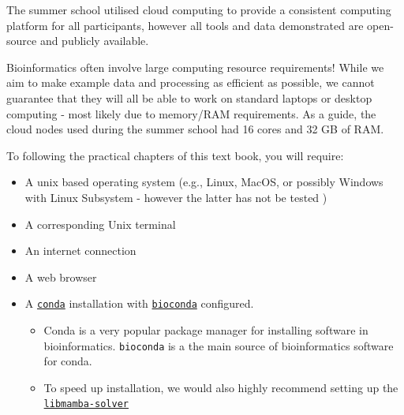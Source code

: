 \documentclass[
  letterpaper,
]{book}
\providecommand{\tightlist}{%
  \setlength{\itemsep}{0pt}\setlength{\parskip}{0pt}}\usepackage{longtable,booktabs,array}
\begin{document}
The summer school utilised cloud computing to provide a consistent
computing platform for all participants, however all tools and data
demonstrated are open-source and publicly available.

\begin{tcolorbox}[enhanced jigsaw, opacitybacktitle=0.6, bottomtitle=1mm, opacityback=0, colback=white, coltitle=black, leftrule=.75mm, toprule=.15mm, title=\textcolor{quarto-callout-warning-color}{\faExclamationTriangle}\hspace{0.5em}{Warning}, colframe=quarto-callout-warning-color-frame, toptitle=1mm, arc=.35mm, left=2mm, titlerule=0mm, breakable, rightrule=.15mm, bottomrule=.15mm, colbacktitle=quarto-callout-warning-color!10!white]

Bioinformatics often involve large computing resource requirements!
While we aim to make example data and processing as efficient as
possible, we cannot guarantee that they will all be able to work on
standard laptops or desktop computing - most likely due to memory/RAM
requirements. As a guide, the cloud nodes used during the summer school
had 16 cores and 32 GB of RAM.

\end{tcolorbox}

To following the practical chapters of this text book, you will require:

\begin{itemize}
\tightlist
\item
  A unix based operating system (e.g., Linux, MacOS, or possibly Windows
  with Linux Subsystem - however the latter has not be tested )
\item
  A corresponding Unix terminal
\item
  An internet connection
\item
  A web browser
\item
  A
  \href{https://docs.conda.io/en/latest/miniconda.html}{\texttt{conda}}
  installation with
  \href{https://bioconda.github.io/\#usage}{\texttt{bioconda}}
  configured.

  \begin{itemize}
  \tightlist
  \item
    Conda is a very popular package manager for installing software in
    bioinformatics. \texttt{bioconda} is a the main source of
    bioinformatics software for conda.
  \item
    To speed up installation, we would also highly recommend setting up
    the
    \href{https://www.anaconda.com/blog/a-faster-conda-for-a-growing-community}{\texttt{libmamba-solver}}
  \end{itemize}
\end{itemize}
\end{document}
